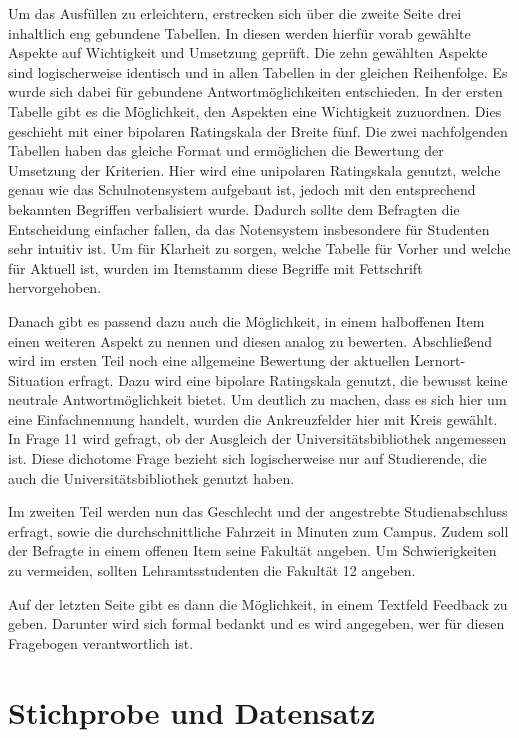 \documentclass[11pt, a4paper]{article}
\begin{document}
	Um das Ausfüllen zu erleichtern, erstrecken sich über die zweite Seite drei inhaltlich eng gebundene Tabellen. In diesen werden hierfür vorab gewählte Aspekte auf Wichtigkeit und Umsetzung geprüft. Die zehn gewählten Aspekte sind logischerweise identisch und in allen Tabellen in der gleichen Reihenfolge.
	Es wurde sich dabei für gebundene Antwortmöglichkeiten entschieden.
	In der ersten Tabelle gibt es die Möglichkeit, den Aspekten eine Wichtigkeit zuzuordnen. Dies geschieht mit einer bipolaren Ratingskala der Breite fünf.
	Die zwei nachfolgenden Tabellen haben das gleiche Format und ermöglichen die Bewertung der Umsetzung der Kriterien. Hier wird eine unipolaren Ratingskala genutzt, welche genau wie das Schulnotensystem aufgebaut ist, jedoch 
	mit den entsprechend bekannten Begriffen verbalisiert wurde.
	Dadurch sollte dem Befragten die Entscheidung einfacher fallen, da das Notensystem insbesondere für Studenten sehr intuitiv ist.
	Um für Klarheit zu sorgen, welche Tabelle für Vorher und welche für Aktuell ist, wurden im Itemstamm diese Begriffe mit Fettschrift hervorgehoben.
	
	Danach gibt es passend dazu auch die Möglichkeit, in einem halboffenen Item einen weiteren Aspekt zu nennen und diesen analog zu bewerten.
	Abschließend wird im ersten Teil noch eine allgemeine Bewertung der aktuellen Lernort-Situation erfragt.
	Dazu wird eine bipolare Ratingskala genutzt, die bewusst keine neutrale Antwortmöglichkeit bietet.
	Um deutlich zu machen, dass es sich hier um eine Einfachnennung handelt, wurden die Ankreuzfelder hier mit Kreis gewählt.
	In Frage 11 wird gefragt, ob der Ausgleich der Universitätsbibliothek angemessen ist. Diese dichotome Frage bezieht sich logischerweise nur auf Studierende, die auch die Universitätsbibliothek genutzt haben. 
	
	Im zweiten Teil werden nun das Geschlecht und der angestrebte Studienabschluss erfragt, sowie die durchschnittliche Fahrzeit in Minuten zum Campus.
	Zudem soll der Befragte in einem offenen Item seine Fakultät angeben.
	Um Schwierigkeiten zu vermeiden, sollten Lehramtsstudenten die Fakultät 12 angeben.
	
	Auf der letzten Seite gibt es dann die Möglichkeit, in einem Textfeld Feedback zu geben.
	Darunter wird sich formal bedankt und es wird angegeben, wer für diesen Fragebogen verantwortlich ist.
	\newpage
	\section{Stichprobe und Datensatz}
	\label{Stichprobe und Datensatz}
	
\end{document}

